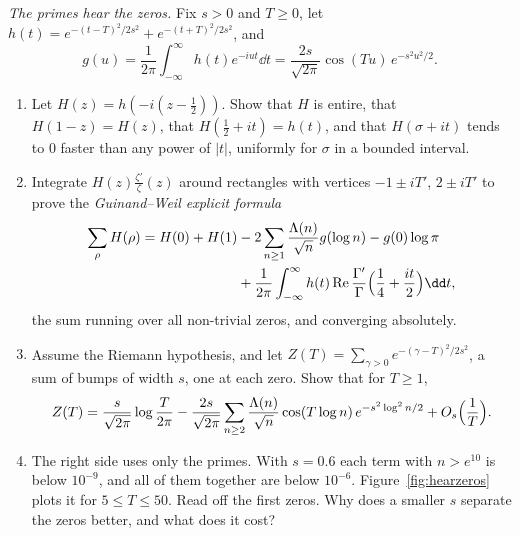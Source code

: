 \begin{exercise}[Journey]\label{pb:hearzeros}
\emph{The primes hear the zeros.} Fix $s>0$ and $T\ge0$, let $h(t)=e^{-(t-T)^2/2s^2}+e^{-(t+T)^2/2s^2}$, and
\[
g(u)=\frac1{2\pi}\int_{-\infty}^\infty h(t)e^{-iut}\dd t=\frac{2s}{\sqrt{2\pi}}\cos(Tu)\,e^{-s^2u^2/2}.
\]
\begin{enumerate}[label=(\alph*)]
\item Let $H(z)=h(-i(z-\frac12))$. Show that $H$ is entire, that $H(1-z)=H(z)$, that $H(\frac12+it)=h(t)$, and that $H(\sigma+it)$ tends to $0$ faster than any
power of $|t|$, uniformly for $\sigma$ in a bounded interval.
\item Integrate $H(z)\frac{\zeta'}\zeta(z)$ around rectangles with vertices $-1\pm iT'$, $2\pm iT'$ to prove the \emph{Guinand--Weil explicit formula}
\[
\begin{aligned}\sum_\rho H(\rho)=H(0)+H(1)&-2\sum_{n\ge1}\frac{\Lambda(n)}{\sqrt n}g(\log n)-g(0)\log\pi\\&+\frac1{2\pi}\int_{-\infty}^\infty h(t)\operatorname{Re}\frac{\Gamma'}\Gamma\Bigl(\frac14+\frac{it}2\Bigr)\dd t,\end{aligned}
\]
the sum running over all non-trivial zeros, and converging absolutely.
\item Assume the Riemann hypothesis, and let $Z(T)=\sum_{\gamma>0}e^{-(\gamma-T)^2/2s^2}$, a sum of bumps of width $s$, one at each zero. Show that for $T\ge1$,
\[
Z(T)=\frac s{\sqrt{2\pi}}\log\frac T{2\pi}-\frac{2s}{\sqrt{2\pi}}\sum_{n\ge2}\frac{\Lambda(n)}{\sqrt n}\cos(T\log n)\,e^{-s^2\log^2n/2}+O_s\Bigl(\frac1T\Bigr).
\]
\item The right side uses only the primes. With $s=0.6$ each term with $n>e^{10}$ is below $10^{-9}$, and all of them together are below $10^{-6}$. Figure~\ref{fig:hearzeros} plots it for $5\le T\le50$. Read off
the first zeros. Why does a smaller $s$ separate the zeros better, and what does it cost?
\end{enumerate}
\end{exercise}

